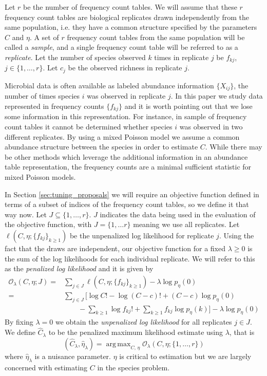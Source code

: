 \documentclass[oupdraft]{bio}
\DeclareMathOperator*{\argmax}{arg\,max}
\begin{document}
Let $r$ be the number of frequency count tables.  We will assume that these $r$ frequency count tables are biological replicates drawn independently from the same population, i.e. they have a common structure specified by the parameters $C$ and $\eta$.  A set of $r$ frequency count tables from the same population will be called a \textit{sample}, and a single frequency count table will be referred to as a \textit{replicate}.  Let the number of species observed $k$ times in replicate $j$ be $f_{kj}$, $j \in \{1, \dots , r\}$.  Let $c_j$ be the observed richness in replicate $j$.

Microbial data is often available as labeled abundance information $\{ X_{ij} \}$, the number of times species $i$ was observed in replicate $j$.  In this paper we study data represented in frequency counts $\{f_{kj}\}$ and it is worth pointing out that we lose some information in this representation.  For instance, in sample of frequency count tables it cannot be determined whether species $i$ was observed in two different replicates.  By using a mixed Poisson model we assume a common abundance structure between the species in order to estimate $C$.  While there may be other methods which leverage the additional information in an abundance table representation, the frequency counts are a minimal sufficient statistic for mixed Poisson models.

In Section \ref{sec:tuning_proposals} we will require an objective function defined in terms of a subset of indices of the frequency count tables, so we define it that way now.  Let $J \subseteq \{1, \dots, r\}$.  $J$ indicates the data being used in the evaluation of the objective function, with $J = \{1, \dots r\}$ meaning we use all replicates.  Let $\ell \left(C, \eta; \{f_{kj}\}_{k \geq 1} \right)$ be the unpenalized log likelihood for replicate $j$.  Using the fact that the draws are independent, our objective function for a fixed $\lambda \geq 0$ is the sum of the log likelihoods for each individual replicate.  We will refer to this as the \textit{penalized log likelihood} and it is given by
\begin{align}
\mathcal{O}_{\lambda}(C, \eta; J) =& \sum_{j \in J} \ell \left(C, \eta; \{f_{kj}\}_{k \geq 1} \right) - \lambda\log p_{\eta}(0) \\
 =& \sum_{j \in J} \biggl[ \log C! - \log (C-c)! + (C-c) \log p_\eta(0)  \nonumber \\   
 & \qquad  - \sum_{k \geq 1} \log{} f_{kj}! + \sum_{k \geq 1} f_{kj} \log p_\eta(k) \biggr] - \lambda \log p_\eta(0)    \label{eq:objective}
\end{align}
By fixing $\lambda = 0$ we obtain the \textit{unpenalized log likelihood} for all replicates $j \in J$.  We define $\widehat{C}_{\lambda}$ to be the penalized maximum likelihood estimate using $\lambda$, that is
\begin{equation}
\left(\widehat{C}_{\lambda},  \widehat{\eta}_{\lambda} \right) = \argmax_{C, \, \eta}  \mathcal{O}_{\lambda} \left(C, \eta ; \{1, \dots , r\} \right) \label{eq:ccc_hat_lambda}
\end{equation}
where $\widehat{\eta}_{\lambda}$ is a nuisance parameter.  $\eta$ is critical to estimation but we are largely concerned with estimating $C$ in the species problem.
\end{document}
